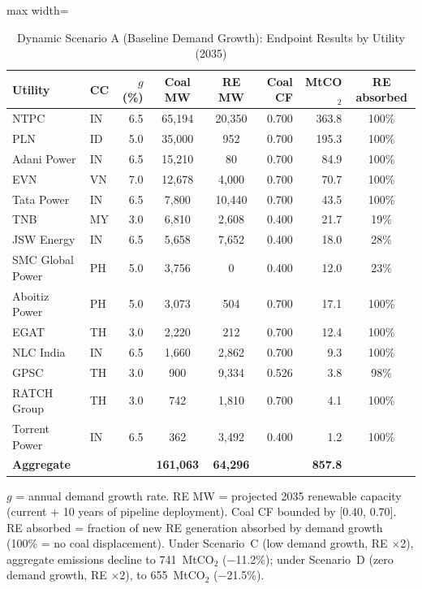 \documentclass[review,3p,authoryear]{elsarticle}
\begin{document}
\begin{table}[H]
\centering
\caption{Dynamic Scenario A (Baseline Demand Growth): Endpoint Results by Utility (2035)}
\label{tab:dynamic_full}
\small
\begin{adjustbox}{max width=\linewidth}
\begin{tabular}{@{}llrccrrc@{}}
\toprule
\textbf{Utility} & \textbf{CC} & \textbf{$g$ (\%)} & \textbf{Coal MW} & \textbf{RE MW} & \textbf{Coal CF} & \textbf{MtCO$_2$} & \textbf{RE absorbed} \\
\midrule
NTPC & IN & 6.5 & 65,194 & 20,350 & 0.700 & 363.8 & 100\% \\
PLN & ID & 5.0 & 35,000 & 952 & 0.700 & 195.3 & 100\% \\
Adani Power & IN & 6.5 & 15,210 & 80 & 0.700 & 84.9 & 100\% \\
EVN & VN & 7.0 & 12,678 & 4,000 & 0.700 & 70.7 & 100\% \\
Tata Power & IN & 6.5 & 7,800 & 10,440 & 0.700 & 43.5 & 100\% \\
TNB & MY & 3.0 & 6,810 & 2,608 & 0.400 & 21.7 & 19\% \\
JSW Energy & IN & 6.5 & 5,658 & 7,652 & 0.400 & 18.0 & 28\% \\
SMC Global Power & PH & 5.0 & 3,756 & 0 & 0.400 & 12.0 & 23\% \\
Aboitiz Power & PH & 5.0 & 3,073 & 504 & 0.700 & 17.1 & 100\% \\
EGAT & TH & 3.0 & 2,220 & 212 & 0.700 & 12.4 & 100\% \\
NLC India & IN & 6.5 & 1,660 & 2,862 & 0.700 & 9.3 & 100\% \\
GPSC & TH & 3.0 & 900 & 9,334 & 0.526 & 3.8 & 98\% \\
RATCH Group & TH & 3.0 & 742 & 1,810 & 0.700 & 4.1 & 100\% \\
Torrent Power & IN & 6.5 & 362 & 3,492 & 0.400 & 1.2 & 100\% \\
\midrule
\textbf{Aggregate} & & & \textbf{161,063} & \textbf{64,296} & & \textbf{857.8} & \\
\bottomrule
\end{tabular}
\end{adjustbox}
\begin{flushleft}
\footnotesize{$g$ = annual demand growth rate. RE MW = projected 2035 renewable capacity (current + 10 years of pipeline deployment). Coal CF bounded by [0.40, 0.70]. RE absorbed = fraction of new RE generation absorbed by demand growth (100\% = no coal displacement). Under Scenario~C (low demand growth, RE $\times$2), aggregate emissions decline to 741~MtCO$_2$ ($-$11.2\%); under Scenario~D (zero demand growth, RE $\times$2), to 655~MtCO$_2$ ($-$21.5\%).}
\end{flushleft}
\end{table}
\end{document}
